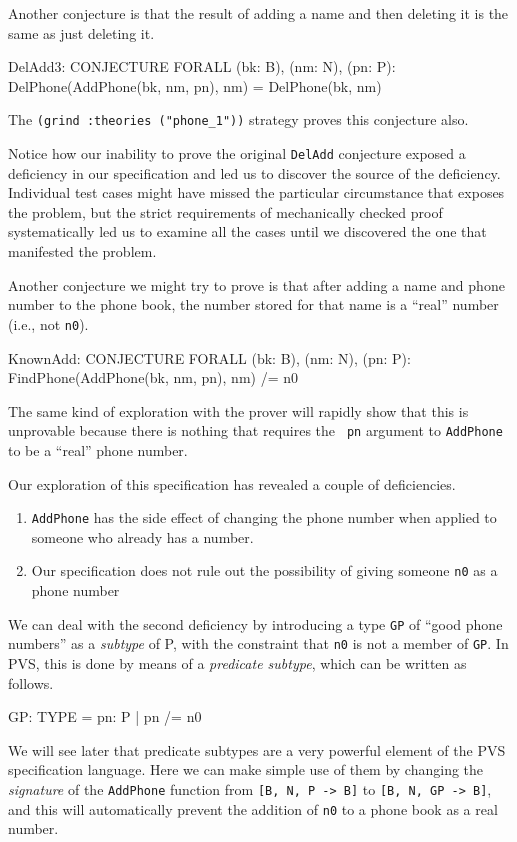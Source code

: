 Another conjecture is that the result of adding a name and then
deleting it is the same as just deleting it.
\begin{pvsexample}
DelAdd3: CONJECTURE  FORALL (bk: B), (nm: N), (pn: P):
  DelPhone(AddPhone(bk, nm, pn), nm) = DelPhone(bk, nm)
\end{pvsexample}
The {\tt (grind :theories ("phone\_1"))} strategy proves this
conjecture also.

Notice how our inability to prove the original {\tt DelAdd} conjecture
exposed a deficiency in our specification and led us to discover the
source of the deficiency.  Individual test cases might have missed the
particular circumstance that exposes the problem, but the strict
requirements of mechanically checked proof systematically led us to
examine all the cases until we discovered the one that manifested the
problem.

Another conjecture we might try to prove is that after adding a name
and phone number to the phone book, the number stored for that name is
a ``real'' number (i.e., not {\tt n0}).
\begin{pvsexample}
KnownAdd: CONJECTURE  FORALL (bk: B), (nm: N), (pn: P):
  FindPhone(AddPhone(bk, nm, pn), nm) /= n0
\end{pvsexample}
The same kind of exploration with the prover will rapidly show that
this is unprovable because there is nothing that requires the {\tt
pn} argument to {\tt AddPhone} to be a ``real'' phone number.

Our exploration of this specification has revealed a couple of
deficiencies.
\begin{enumerate}
\item {\tt AddPhone} has the side effect of changing the phone number
when applied to someone who already has a number.

\item Our specification does not rule out the possibility
      of giving someone {\tt n0} as a phone number
\end{enumerate}

We can deal with the second deficiency by introducing a type {\tt GP}
of ``good phone numbers'' as a {\em subtype\/} of P, with the
constraint that {\tt n0} is not a member of {\tt GP}.  In PVS, this is
done by means of a {\em predicate subtype}, which can be written as
follows.
\begin{pvsexample}
GP: TYPE = { pn: P | pn /= n0 }
\end{pvsexample}
We will see later that predicate subtypes are a very powerful element
of the PVS specification language.  Here we can make simple use of
them by changing the {\em signature\/} of the {\tt AddPhone}
function from {\tt [B, N, P -> B]} to {\tt [B, N, GP -> B]}, and this
will automatically prevent the addition of {\tt n0} to a phone book as
a real number.

